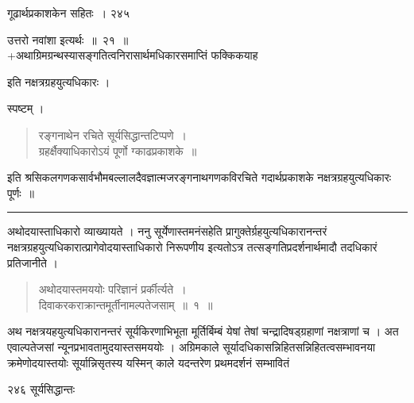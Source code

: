 \documentclass[11pt, openany]{book}
\begin{document}
\hspace{3cm} गूढार्थप्रकाशकेन सहितः~। \hfill २४५
\vspace{1cm}

उत्तरो नवांशा इत्यर्थः~॥~२१~॥\\
\noindent 
+अथाग्रिमग्रन्थस्यासङ्गतित्वनिरासार्थमधिकारसमाप्तिं फक्किकयाह \textendash 

\begin{center}
 इति नक्षत्रग्रहयुत्यधिकारः । 
\end{center}

\noindent स्पष्टम् । 

 \begin{quote}
 {\ssi रङ्गनाथेन रचिते सूर्यसिद्धान्तटिप्पणे~।\\
 ग्रहर्क्षैक्याधिकारोऽयं पूर्णो ग्काढप्रकाशके~॥}
\end{quote}

 इति श्रसिकलगणकसार्वभौमबल्लालदैवज्ञात्मजरङ्गनाथगणकविरचिते गदार्थप्रकाशके नक्षत्रग्रहयुत्यधिकारः पूर्णः~॥ 

\vspace{3mm}

\noindent\rule{\linewidth}{.5pt}
\vspace{3mm}


 अथोदयास्ताधिकारो व्याख्यायते । ननु सूर्येणास्तमनंसहेति प्रागुक्तेर्ग्रहयुत्यधिकारानन्तरं नक्षत्रग्रहयुत्यधिकारात्प्रागेवोदयास्ताधिकारो निरूपणीय इत्यतोऽत्र तत्सङ्गतिप्रदर्शनार्थमादौ तदधिकारं प्रतिजानीते । 


\begin{quote}
{\ssi अथोदयास्तमययोः परिज्ञानं प्रर्कीर्त्यते~।\\
दिवाकरकराक्रान्तमूर्तीनामल्पतेजसाम्~॥~१~॥ }
\end{quote}

 अथ नक्षत्रयहयुत्यधिकारानन्तरं सूर्यकिरणाभिभूता मूर्तिर्बिम्बं येषां तेषां चन्द्रादिषड्ग्रहाणां नक्षत्राणां च । अत एवाल्पतेजसां न्यूनप्रभावतामुदयास्तसमययोः । अग्रिमकाले सूर्यादधिकासन्निहितसन्निहितत्वसम्भावनया क्रमेणोदयास्तयोः सूर्यान्निसृतस्य यस्मिन् काले यदन्तरेण प्रथमदर्शनं सम्भावितं



\newpage

\noindent २४६ \hspace{3cm} सूर्यसिद्धान्तः
\vspace{1cm}
\end{document}
